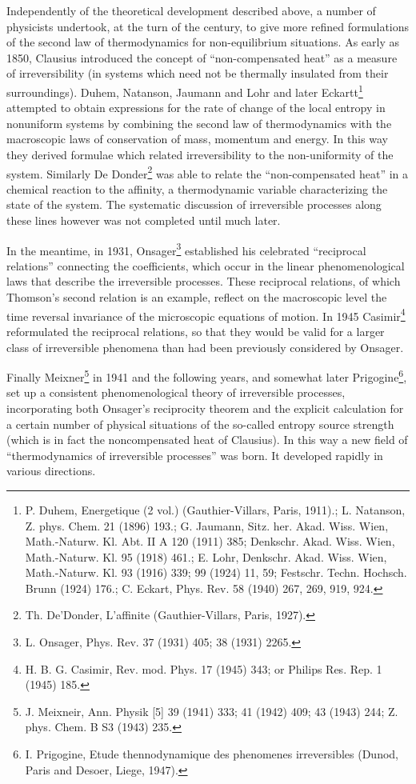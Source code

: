 Independently of the theoretical development described above, a number of physicists undertook, at the turn of the century, to give more refined formulations of the second law of thermodynamics for non-equilibrium situations. As early as 1850, Clausius introduced the concept of ``non-compensated heat'' as a measure of irreversibility (in systems which need not be thermally insulated from their surroundings). Duhem, Natanson, Jaumann and Lohr and later Eckartt\footnote{P. Duhem, Energetique (2 vol.) (Gauthier-Villars, Paris, 1911).;  L. Natanson, Z. phys. Chem. 21 (1896) 193.; G. Jaumann, Sitz. her. Akad. Wiss. Wien, Math.-Naturw. Kl. Abt. II A 120 (1911) 385; Denkschr. Akad. Wiss. Wien, Math.-Naturw. Kl. 95 (1918) 461.; E. Lohr, Denkschr. Akad. Wiss. Wien, Math.-Naturw. Kl. 93 (1916) 339; 99 (1924) 11, 59; Festschr. Techn. Hochsch. Brunn (1924) 176.; C. Eckart, Phys. Rev. 58 (1940) 267, 269, 919, 924.} attempted to obtain expressions for the rate of change of the local entropy in nonuniform systems by combining the second law of thermodynamics
with the macroscopic laws of conservation of mass, momentum and energy. In this way they derived formulae which related irreversibility to the non-uniformity of the system. Similarly De Donder\footnote{Th. De'Donder, L'affinite (Gauthier-Villars, Paris, 1927).} was able to relate the ``non-compensated heat'' in a chemical reaction to the affinity, a thermodynamic variable characterizing the state of the system. The systematic discussion of irreversible processes along these
lines however was not completed until much later.

In the meantime, in 1931, Onsager\footnote{L. Onsager, Phys. Rev. 37 (1931) 405; 38 (1931) 2265.} established his celebrated ``reciprocal relations'' connecting the coefficients, which occur in the linear phenomenological laws that describe the irreversible processes. These reciprocal relations, of which Thomson's second relation is an example, reflect on the macroscopic level the time reversal invariance of the microscopic equations of motion. In 1945 Casimir\footnote{H. B. G. Casimir, Rev. mod. Phys. 17 (1945) 343; or Philips Res. Rep. 1 (1945) 185.} reformulated the reciprocal relations, so that they would be valid for a larger class of irreversible phenomena than had been previously considered by Onsager.

Finally Meixner\footnote{J. Meixneir, Ann. Physik [5] 39 (1941) 333; 41 (1942) 409; 43 (1943) 244; Z. phys. Chem. B S3 (1943) 235.} in 1941 and the following years, and somewhat later Prigogine\footnote{I. Prigogine, Etude thennodynamique des phenomenes irreversibles (Dunod, Paris and Desoer, Liege, 1947).}, set up a consistent phenomenological theory of irreversible processes, incorporating both Onsager's reciprocity theorem and the explicit calculation for a certain number of physical situations of the so-called entropy source strength (which is in fact the noncompensated heat of Clausius). In this way a new field of ``thermodynamics of irreversible processes'' was born. It developed rapidly in various directions.


